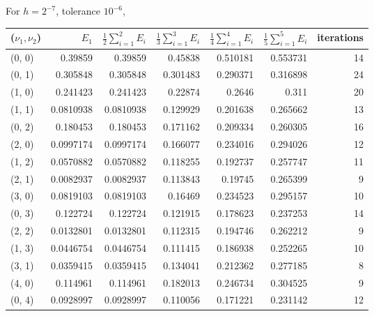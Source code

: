 \documentclass[12pt]{article}
\begin{document}
For $h=2^{-7}$, tolerance $10^{-6}$, \\
\begin{table}
\centering
\begin{tabular}{||l|rrrrr|r||}
\hline \hline
    ($\nu_1, \nu_2$)  &  $E_1$ & $\displaystyle\frac{1}{2} \sum_{i=1}^2 E_i $ &  $\displaystyle\frac{1}{3} \sum_{i=1}^3 E_i $  &  $\displaystyle\frac{1}{4} \sum_{i=1}^4 E_i $  &   $\displaystyle\frac{1}{5} \sum_{i=1}^5 E_i $  &   iterations \\
\hline \hline
 (0, 0)   & 0.39859   &      0.39859   &       0.45838  &       0.510181 &       0.553731 &           14 \\ \hline
 (0, 1)   & 0.305848  &      0.305848  &       0.301483 &       0.290371 &       0.316898 &           24 \\
 (1, 0)   & 0.241423  &      0.241423  &       0.22874  &       0.2646   &       0.311    &           20 \\ \hline
 (1, 1)   & 0.0810938 &      0.0810938 &       0.129929 &       0.201638 &       0.265662 &           13 \\
 (0, 2)   & 0.180453  &      0.180453  &       0.171162 &       0.209334 &       0.260305 &           16 \\
 (2, 0)   & 0.0997174 &      0.0997174 &       0.166077 &       0.234016 &       0.294026 &           12 \\ \hline
 (1, 2)   & 0.0570882 &      0.0570882 &       0.118255 &       0.192737 &       0.257747 &           11 \\
 (2, 1)   & 0.0082937 &      0.0082937 &       0.113843 &       0.19745  &       0.265399 &            9 \\
 (3, 0)   & 0.0819103 &      0.0819103 &       0.16469  &       0.234523 &       0.295157 &           10 \\
 (0, 3)   & 0.122724  &      0.122724  &       0.121915 &       0.178623 &       0.237253 &           14 \\ \hline
 (2, 2)   & 0.0132801 &      0.0132801 &       0.112315 &       0.194746 &       0.262212 &            9 \\
 (1, 3)   & 0.0446754 &      0.0446754 &       0.111415 &       0.186938 &       0.252265 &           10 \\
 (3, 1)   & 0.0359415 &      0.0359415 &       0.134041 &       0.212362 &       0.277185 &            8 \\
 (4, 0)   & 0.114961  &      0.114961  &       0.182013 &       0.246734 &       0.304525 &            9 \\
 (0, 4)   & 0.0928997 &      0.0928997 &       0.110056 &       0.171221 &       0.231142 &           12 \\
\hline \hline
\end{tabular}
\end{table}
\end{document}
